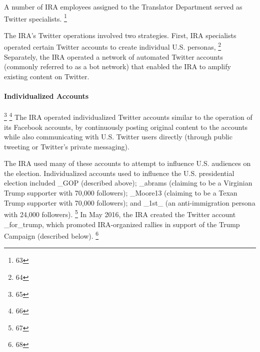 A number of IRA employees assigned to the Translator Department served as Twitter specialists.
\footnote{63}

The IRA's Twitter operations involved two strategies.
First, IRA specialists operated certain Twitter accounts to create individual U.S. personas, %
\footnote{64}
Separately, the IRA operated a network of automated Twitter accounts (commonly referred to as a bot network) that enabled the IRA to amplify existing content on Twitter.

\paragraph{Individualized Accounts}

\footnote{65}
\footnote{66}
The IRA operated individualized Twitter accounts similar to the operation of its Facebook accounts, by continuously posting original content to the accounts while also communicating with U.S. Twitter users directly (through public tweeting or Twitter's private messaging).

The IRA used many of these accounts to attempt to influence U.S. audiences on the election.
Individualized accounts used to influence the U.S. presidential election included \@TEN\_GOP (described above); \@jenn\_abrams (claiming to be a Virginian Trump supporter with 70,000 followers); \@Pamela\_Moore13 (claiming to be a Texan Trump supporter with 70,000 followers); and \@America\_1st\_ (an anti-immigration persona with 24,000 followers).%
\footnote{67}
In May 2016, the IRA created the Twitter account \@march\_for\_trump, which promoted IRA-organized rallies in support of the Trump Campaign (described below).%
\footnote{68}


